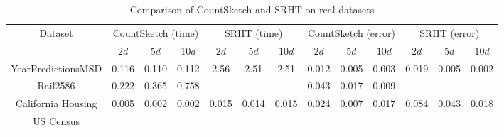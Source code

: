 \begin{table}[ht]
\centering
\begin{adjustbox}{width=1\textwidth}
\small

\begin{tabular}{|c|c|c|c|c|c|c|c|c|c|c|c|c|}
  \hline
\multirow{2}{*}{Dataset} & \multicolumn{3}{c|}{CountSketch (time)} & \multicolumn{3}{c}{SRHT (time)} & \multicolumn{3}{c|}{CountSketch (error)} & \multicolumn{3}{c|}{SRHT (error)} \\
                        &     $2d$       &  $5d$            & $10d$          & $2d$          & $5d$        & $10d$         &     $2d$       &  $5d$          &   $10d$         &  $2d$          & $5d$         & $10d$  \\
\hline
YearPredictionsMSD                         &    0.116         &   0.110          &  0.112          &  2.56         &  2.51        &   2.51        &  0.012           &   0.005          &    0.003           &   0.019        &   0.005        &  0.002         \\
Rail2586            &  0.222           &  0.365           &  0.758             &  -         & -         & -           & 0.043             &  0.017             &  0.009            & -          & -           & -           \\
California Housing     &   0.005          &  0.002           &   0.002          &  0.015         &  0.014        & 0.015          &   0.024          &  0.007           & 0.017       & 0.084          & 0.043         & 0.018 \\
US Census    &            &           &          &      &         &            &            &              &         &          &  &        \\
\hline
\end{tabular}
\end{adjustbox}
\caption{Comparison of CountSketch and SRHT on real datasets}
\label{table: real-data-subspace-embedding}
\end{table}


